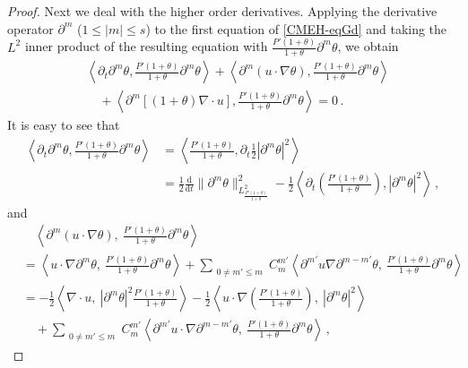 \documentclass[reqno,11pt]{amsart}
\numberwithin{equation}{section}
\def\d{\mathrm{d}}
\begin{document}
\begin{proof}
Next we deal with the higher order derivatives. Applying the derivative operator $\partial^m$ ($1\le |m|\le s$) to the first equation of \eqref{CMEH-eqGd} and taking the $L^2$ inner product of the resulting equation with $\frac{P'(1+\theta)}{1+\theta}\partial^m\theta$, we obtain
\begin{equation}\label{nd7}
\begin{aligned}
&\left\langle \partial_t \partial^m \theta, \frac{P'(1+\theta)}{1+\theta} \partial^m \theta \right\rangle + \left\langle \partial^m (u \cdot \nabla \theta), \frac{P'(1+\theta)}{1+\theta} \partial^m \theta \right\rangle\\&\quad+ \left\langle \partial^m [(1+\theta) \nabla \cdot u], \frac{P'(1+\theta)}{1+\theta} \partial^m \theta \right\rangle = 0 
 \,.
\end{aligned}
\end{equation}
It is easy to see that
\begin{equation}\label{nd8}
\begin{aligned}
\left\langle \partial_t \partial^m \theta, \frac{P'(1+\theta)}{1+\theta} \partial^m \theta \right\rangle& = \left\langle \frac{P'(1+\theta)}{1+\theta}, \partial_t \frac{1}{2} |\partial^m \theta|^2 \right\rangle\\& = \frac{1}{2} \frac{\d}{\d t} \|\partial^m \theta\|^2_{L^2_{\frac{P'(1+\theta)}{1+\theta}}}  - \frac{1}{2} \left\langle \partial_t \left(\frac{P'(1+\theta)}{1+\theta}\right), |\partial^m \theta|^2 \right\rangle
 \,,
\end{aligned}
\end{equation}
and
\begin{equation}\label{nd9}
\begin{aligned}
 & \quad \left\langle \partial^m (u \cdot \nabla \theta),\ \frac{P'(1+\theta)}{1+\theta} \partial^m \theta \right\rangle \\
 & =  \left\langle u \cdot \nabla \partial^m \theta,\ \frac{P'(1+\theta)}{1+\theta} \partial^m \theta \right\rangle +\sum_{\substack{0 \neq m' \leq m}} C^{m'}_m \left\langle \partial^{m'} u \nabla \partial^{m-m'} \theta,\ \frac{P'(1+\theta)}{1+\theta} \partial^m \theta \right\rangle \\
 & = -\frac{1}{2}\left\langle \nabla \cdot u,\ |\partial^m \theta|^2 \frac{P'(1+\theta)}{1+\theta} \right\rangle - \frac{1}{2}\left\langle u \cdot \nabla \left( \frac{P'(1+\theta)}{1+\theta} \right),\ |\partial^m \theta|^2 \right\rangle \\
 & \quad + \sum_{\substack{0 \neq m' \leq m}} C^{m'}_m \left\langle \partial^{m'} u \cdot \nabla \partial^{m-m'} \theta,\ \frac{P'(1+\theta)}{1+\theta} \partial^m \theta \right\rangle \,,

\end{aligned}
\end{equation}
\end{proof}
\end{document}
